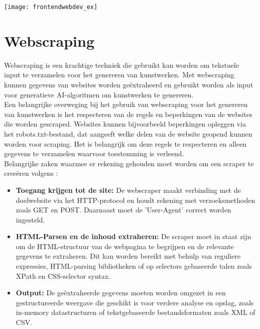 \begin{center}
    \texttt{[image: frontendwebdev\_ex]}
    \label{fig:frontendwebdev_ex}
\end{center}


\section{Webscraping}
\label{ch:liter_webscraping}
Webscraping is een krachtige techniek die gebruikt kan worden om tekstuele input te verzamelen voor het genereren van kunstwerken. Met webscraping kunnen gegevens van websites worden geëxtraheerd en gebruikt worden als input voor generatieve AI-algoritmen om kunstwerken te genereren. \\
 
Een belangrijke overweging bij het gebruik van webscraping voor het genereren van kunstwerken is het respecteren van de regels en beperkingen van de websites die worden gescraped. Websites kunnen bijvoorbeeld beperkingen opleggen via het robots.txt-bestand, dat aangeeft welke delen van de website geopend kunnen worden voor scraping. Het is belangrijk om deze regels te respecteren en alleen gegevens te verzamelen waarvoor toestemming is verleend. \\

Belangrijke zaken waarmee er rekening gehouden moet worden om een scraper te creeëren volgens \autocite{BIO2014}:

\begin{itemize}
    \item \textbf{Toegang krijgen tot de site:} De webscraper maakt verbinding met de doelwebsite via het HTTP-protocol en houdt rekening met verzoeksmethoden zoals GET en POST. Daarnaast moet de 'User-Agent' correct worden ingesteld.
    \item \textbf{HTML-Parsen en de inhoud extraheren:} De scraper moet in staat zijn om de HTML-structuur van de webpagina te begrijpen en de relevante gegevens te extraheren. Dit kan worden bereikt met behulp van reguliere expressies, HTML-parsing bibliotheken of op selectors gebaseerde talen zoals XPath en CSS-selector syntax.
    \item \textbf{Output:} De geëxtraheerde gegevens moeten worden omgezet in een gestructureerde weergave die geschikt is voor verdere analyse en opslag, zoals in-memory datastructuren of tekstgebaseerde bestandsformaten zoals XML of CSV.
\end{itemize}

